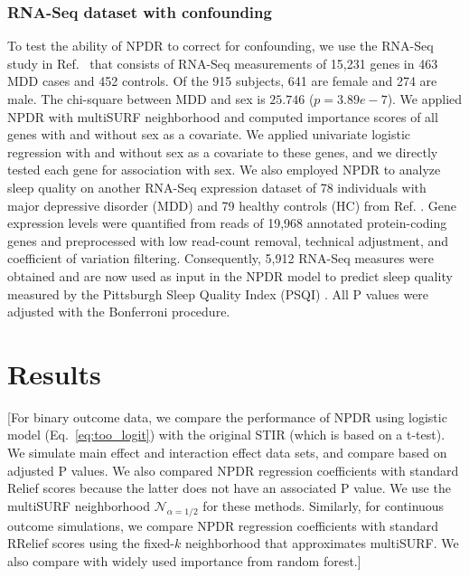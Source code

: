 \documentclass[10pt]{article}
\begin{document}
\subsubsection{RNA-Seq dataset with confounding}
To test the ability of NPDR to correct for confounding, we use the RNA-Seq study in Ref.~\cite{mostafavi14} that consists of RNA-Seq measurements of 15,231 genes in 463 MDD cases and 452 controls.
Of the 915 subjects, 641 are female and 274 are male.
The chi-square between MDD and sex is $25.746$ ($p=3.89e-7$).
We applied NPDR with multiSURF neighborhood and computed importance scores of all genes with and without sex as a covariate. 
We applied univariate logistic regression with and without sex as a covariate to these genes, and we directly tested each gene for association with sex.
We also employed NPDR to analyze sleep quality on another RNA-Seq expression dataset of 78 individuals with major depressive disorder (MDD) and 79 healthy controls (HC) from Ref. \cite{le18}.
Gene expression levels were quantified from reads of 19,968 annotated protein-coding genes and preprocessed with low read-count removal, technical adjustment, and coefficient of variation filtering.
Consequently, 5,912 RNA-Seq measures were obtained and are now used as input in the NPDR model to predict sleep quality measured by the Pittsburgh Sleep Quality Index (PSQI) \cite{psqi}.
All P values were adjusted with the Bonferroni procedure.


\section{Results}
[For binary outcome data, we compare the performance of NPDR using logistic model (Eq.~\ref{eq:too_logit}) with the original STIR (which is based on a t-test).
We simulate main effect and interaction effect data sets, and compare based on adjusted P values.
We also compared NPDR regression coefficients with standard Relief scores because the latter does not have an associated P value. We use the multiSURF neighborhood $\mathcal{N}_{\alpha=1/2}$ for these methods.
Similarly, for continuous outcome simulations, we compare NPDR regression coefficients with standard RRelief scores using the fixed-$k$ neighborhood that approximates multiSURF.
We also compare with widely used importance from random forest.]
\end{document}
